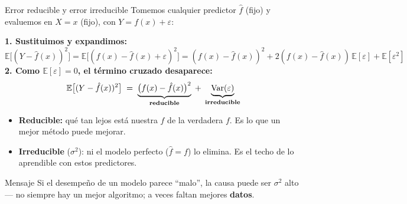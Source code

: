 \documentclass{beamer}
\newcommand{\E}{\mathbb{E}}
\newcommand{\Var}{\mathrm{Var}}
\newcommand{\1}{\mathbb{I}}
\begin{document}
\begin{frame}{Error reducible y error irreducible}
\small
Tomemos cualquier predictor $\hat{f}$ (fijo) y evaluemos en $X = x$ (fijo), con $Y = f(x) + \varepsilon$:
\pause
\vspace{0.1cm}

\textbf{1. Sustituimos y expandimos:}
\[ \E\big[(Y - \hat{f}(x))^2\big] = \E\big[(f(x) - \hat{f}(x) + \varepsilon)^2\big] = (f(x) - \hat{f}(x))^2 + 2(f(x) - \hat{f}(x))\,\E[\varepsilon] + \E[\varepsilon^2] \]
\pause
\textbf{2. Como $\E[\varepsilon] = 0$, el término cruzado desaparece:}
\[ \E\big[(Y - \hat{f}(x))^2\big] \;=\; \underbrace{\big(f(x) - \hat{f}(x)\big)^2}_{\text{\textbf{reducible}}} \;+\; \underbrace{\Var(\varepsilon)}_{\text{\textbf{irreducible}}} \]
\pause

\begin{itemize}\itemsep4pt
  \item \textbf{Reducible:} qué tan lejos está nuestra $\hat{f}$ de la verdadera $f$. Es lo que un mejor método puede mejorar.
  \item \textbf{Irreducible} ($\sigma^2$): ni el modelo perfecto ($\hat{f} = f$) lo elimina. Es el techo de lo aprendible con estos predictores. \pause
\end{itemize}

\begin{block}{Mensaje}
Si el desempeño de un modelo parece ``malo'', la causa puede ser $\sigma^2$ alto --- no siempre hay un mejor algoritmo; a veces faltan mejores \textbf{datos}.
\end{block}
\end{frame}
\end{document}
